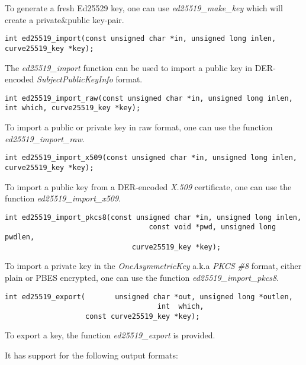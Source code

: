\documentclass[synpaper]{book}
\begin{document}
To generate a fresh Ed25529 key, one can use \textit{ed25519\_make\_key} which will create a private\&public key-pair.

\begin{verbatim}
int ed25519_import(const unsigned char *in, unsigned long inlen, curve25519_key *key);
\end{verbatim}

The \textit{ed25519\_import} function can be used to import a public key in DER-encoded \textit{SubjectPublicKeyInfo} format.

\begin{verbatim}
int ed25519_import_raw(const unsigned char *in, unsigned long inlen, int which, curve25519_key *key);
\end{verbatim}

To import a public or private key in raw format, one can use the function \textit{ed25519\_import\_raw}.

\begin{verbatim}
int ed25519_import_x509(const unsigned char *in, unsigned long inlen, curve25519_key *key);
\end{verbatim}

To import a public key from a DER-encoded \textit{X.509} certificate, one can use the function \textit{ed25519\_import\_x509}.

\begin{verbatim}
int ed25519_import_pkcs8(const unsigned char *in, unsigned long inlen,
                                  const void *pwd, unsigned long pwdlen,
                              curve25519_key *key);
\end{verbatim}

To import a private key in the \textit{OneAsymmetricKey} a.k.a \textit{PKCS \#8} format, either plain or PBES encrypted,
one can use the function \textit{ed25519\_import\_pkcs8}.

\begin{verbatim}
int ed25519_export(       unsigned char *out, unsigned long *outlen,
                                    int  which,
                   const curve25519_key *key);
\end{verbatim}

To export a key, the function \textit{ed25519\_export} is provided.

It has support for the following output formats:
\end{document}
